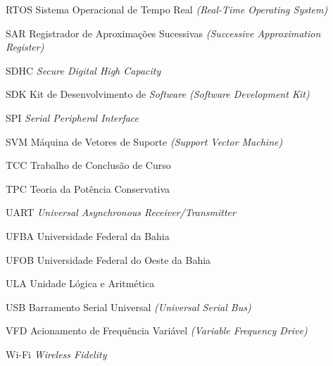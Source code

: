 \begin{acronym}
  \item[RTOS] \qquad Sistema Operacional de Tempo Real \textit{(Real-Time Operating System)}
  \item[SAR] \qquad Registrador de Aproximações Sucessivas \textit{(Successive Approximation Register)}
  \item[SDHC] \qquad \textit{Secure Digital High Capacity}
  \item[SDK] \qquad Kit de Desenvolvimento de \textit{Software (Software Development Kit)}
  \item[SPI] \qquad \textit{Serial Peripheral Interface}
  \item[SVM] \qquad Máquina de Vetores de Suporte \textit{(Support Vector Machine)}
  \item[TCC] \qquad Trabalho de Conclusão de Curso
  \item[TPC] \qquad Teoria da Potência Conservativa
  \item[UART] \qquad \textit{Universal Asynchronous Receiver/Transmitter}
  \item[UFBA] \qquad Universidade Federal da Bahia
  \item[UFOB] \qquad Universidade Federal do Oeste da Bahia
  \item[ULA] \qquad Unidade Lógica e Aritmética
  \item[USB] \qquad Barramento Serial Universal \textit{(Universal Serial Bus)}
  \item[VFD] \qquad Acionamento de Frequência Variável \textit{(Variable Frequency Drive)}
  \item[Wi-Fi] \qquad \textit{Wireless Fidelity}
\end{acronym}